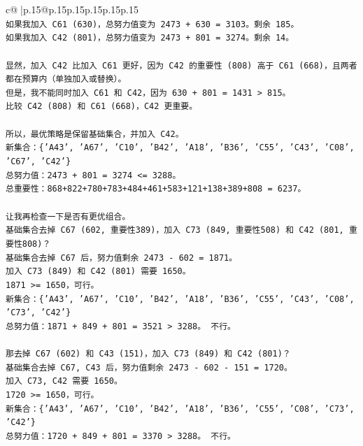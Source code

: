 \documentclass{article}
\begin{document}
{\begin{supertabular}{c@{$\;$}|p{.15\linewidth}@{}p{.15\linewidth}p{.15\linewidth}p{.15\linewidth}p{.15\linewidth}p{.15\linewidth}}
{{{\\ 
\texttt{如果我加入 C61 (630)，总努力值变为 2473 + 630 = 3103。剩余 185。} \\
\texttt{如果我加入 C42 (801)，总努力值变为 2473 + 801 = 3274。剩余 14。} \\
\\ 
\texttt{显然，加入 C42 比加入 C61 更好，因为 C42 的重要性 (808) 高于 C61 (668)，且两者都在预算内（单独加入或替换）。} \\
\texttt{但是，我不能同时加入 C61 和 C42，因为 630 + 801 = 1431 > 815。} \\
\texttt{比较 C42 (808) 和 C61 (668)，C42 更重要。} \\
\\ 
\texttt{所以，最优策略是保留基础集合，并加入 C42。} \\
\texttt{新集合：\{'A43', 'A67', 'C10', 'B42', 'A18', 'B36', 'C55', 'C43', 'C08', 'C67', 'C42'\}} \\
\texttt{总努力值：2473 + 801 = 3274 <= 3288。} \\
\texttt{总重要性：868+822+780+783+484+461+583+121+138+389+808 = 6237。} \\
\\ 
\texttt{让我再检查一下是否有更优组合。} \\
\texttt{基础集合去掉 C67 (602, 重要性389)，加入 C73 (849, 重要性508) 和 C42 (801, 重要性808)？} \\
\texttt{基础集合去掉 C67 后，努力值剩余 2473 {-} 602 = 1871。} \\
\texttt{加入 C73 (849) 和 C42 (801) 需要 1650。} \\
\texttt{1871 >= 1650，可行。} \\
\texttt{新集合：\{'A43', 'A67', 'C10', 'B42', 'A18', 'B36', 'C55', 'C43', 'C08', 'C73', 'C42'\}} \\
\texttt{总努力值：1871 + 849 + 801 = 3521 > 3288。 不行。} \\
\\ 
\texttt{那去掉 C67 (602) 和 C43 (151)，加入 C73 (849) 和 C42 (801)？} \\
\texttt{基础集合去掉 C67, C43 后，努力值剩余 2473 {-} 602 {-} 151 = 1720。} \\
\texttt{加入 C73, C42 需要 1650。} \\
\texttt{1720 >= 1650，可行。} \\
\texttt{新集合：\{'A43', 'A67', 'C10', 'B42', 'A18', 'B36', 'C55', 'C08', 'C73', 'C42'\}} \\
\texttt{总努力值：1720 + 849 + 801 = 3370 > 3288。 不行。} \\
}}}
\end{supertabular}}
\end{document}
